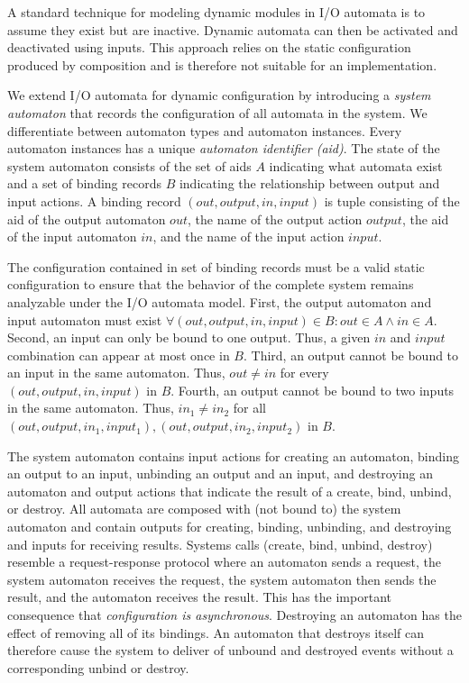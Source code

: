 A standard technique for modeling dynamic modules in I/O automata is to assume they exist but are inactive.
Dynamic automata can then be activated and deactivated using inputs.
This approach relies on the static configuration produced by composition and is therefore not suitable for an implementation.

We extend I/O automata for dynamic configuration by introducing a \emph{system automaton} that records the configuration of all automata in the system.
We differentiate between automaton types and automaton instances.
Every automaton instances has a unique \emph{automaton identifier (aid)}.
The state of the system automaton consists of the set of aids $A$ indicating what automata exist and a set of binding records $B$ indicating the relationship between output and input actions.
A binding record $(out, output, in, input)$ is tuple consisting of the aid of the output automaton $out$, the name of the output action $output$, the aid of the input automaton $in$, and the name of the input action $input$.

The configuration contained in set of binding records must be a valid static configuration to ensure that the behavior of the complete system remains analyzable under the I/O automata model.
First, the output automaton and input automaton must exist $\forall (out, output, in, input) \in B: out \in A \land in \in A$.
Second, an input can only be bound to one output.
Thus, a given $in$ and $input$ combination can appear at most once in $B$.
Third, an output cannot be bound to an input in the same automaton.
Thus, $out \neq in$ for every $(out, output, in, input)$ in $B$.
Fourth, an output cannot be bound to two inputs in the same automaton.
Thus, $in_1 \neq in_2$ for all $(out, output, in_1, input_1), (out, output, in_2, input_2)$ in $B$.

The system automaton contains input actions for creating an automaton, binding an output to an input, unbinding an output and an input, and destroying an automaton and output actions that indicate the result of a create, bind, unbind, or destroy.
All automata are composed with (not bound to) the system automaton and contain outputs for creating, binding, unbinding, and destroying and inputs for receiving results.
Systems calls (create, bind, unbind, destroy) resemble a request-response protocol where an automaton sends a request, the system automaton receives the request, the system automaton then sends the result, and the automaton receives the result.
This has the important consequence that \emph{configuration is asynchronous}.
Destroying an automaton has the effect of removing all of its bindings.
An automaton that destroys itself can therefore cause the system to deliver of unbound and destroyed events without a corresponding unbind or destroy.

